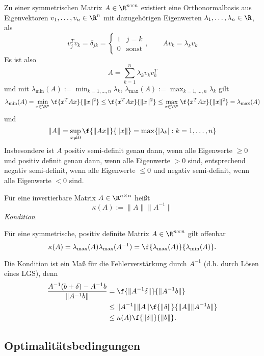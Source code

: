 \begin{st} \label{2.6}
	Zu einer symmetrischen Matrix $A \in \R^{n\times n}$ existiert eine Orthonormalbasis aus Eigenvektoren $v_1, \dotsc, v_n \in \R^n$ mit dazugehörigen Eigenwerten $\lambda_1, \dotsc, \lambda_n \in \R$, als
	\[
		v_j^T v_k
		= \delta_{jk}
		= \begin{cases}
			1 & j = k \\
			0 & \text{sonst}
		\end{cases},\qquad
		Av_k = \lambda_k v_k
	\]
	Es ist also
	\[
		A = \sum_{k=1}^n \lambda_k v_k v_k^T
	\]
	und mit $\lambda_{\text{min}}(A) := \min_{k=1,\dotsc,n} \lambda_k$, $\lambda_{\text{max}}(A) := \max_{k=1,\dotsc,n} \lambda_k$ gilt
	\[
		\lambda_{\text{min}}(A)
		= \min_{x\in\R^n} \f {x^T A x}{\|x\|^2}
		\le \f {x^T A x}{\|x\|^2}
		\le \max_{x\in\R^n} \f {x^TA x}{\|x\|^2}
		= \lambda_{\text{max}}(A)
	\]
	und
	\[
		\|A\|
		= \sup_{x\neq 0} \f{\|Ax\|}{\|x\|}
		= \max \{|\lambda_k| : k=1, \dotsc, n \}
	\]
	Insbesondere ist $A$ positiv semi-definit genau dann, wenn alle Eigenwerte $\ge 0$ und positiv definit genau dann, wenn alle Eigenwerte $>0$ sind,
	entsprechend negativ semi-definit, wenn alle Eigenwerte $\le 0$ und negativ semi-definit, wenn alle Eigenwerte $<0$ sind.
\end{st}

\begin{df} \label{2.7}
	Für eine invertierbare Matrix $A \in \R^{n\times n}$ heißt
	\[
		\kappa(A)
		:= \|A\| \|A^{-1}\|
	\]
	\emph{Kondition}.

	Für eine symmetrische, positiv definite Matrix $A \in \R^{n\times n}$ gilt offenbar
	\[
		\kappa(A)
		= \lambda_{\text{max}}(A) \lambda_{\text{max}}(A^{-1})
		= \f {\lambda_{\text{max}}(A)}{\lambda_{\text{min}}(A)}.
	\]
\end{df}

\begin{nt} \label{2.8}
	Die Kondition ist ein Maß für die Fehlerverstärkung durch $A^{-1}$ (d.h. durch Lösen eines LGS), denn
	\begin{align*}
		\dfrac {A^{-1}(b+\delta) - A^{-1}b}{\|A^{-1}b\|}
		&= \f {\|A^{-1}\delta\|}{\|A^{-1}b\|} \\
		&\le \|A^{-1}\| \|A\| \f {\|\delta\|}{\|A\|\|A^{-1}b\|} \\
		&\le \kappa(A) \f {\|\delta\|}{\|b\|}.
	\end{align*}
\end{nt}

\subsection{Optimalitätsbedingungen}

